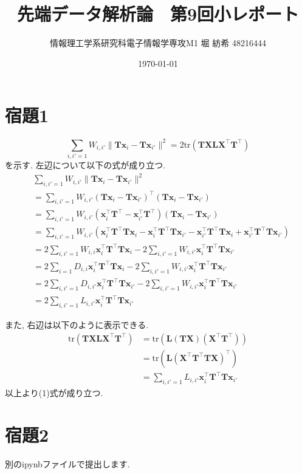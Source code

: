 \documentclass[a4paper,11pt]{jsarticle}
\begin{document}
  \title{先端データ解析論　第9回小レポート}
  \author{情報理工学系研究科電子情報学専攻M1 堀 紡希 48216444}
  \date{\today}
  \maketitle
  \section*{宿題1}
  \begin{equation}
    \sum _{i,i'=1} W_{i,i'}\|{\bm T}{\bm x}_i - {\bm T}{\bm x}_{i'}\|^2 = 2\text{tr} ({\bm T}{\bm X}{\bm L}{\bm X}^\top {\bm T}^\top)
  \end{equation}
  を示す. 左辺について以下の式が成り立つ.
  \begin{align*}
    &\sum _{i, i'=1} W_{i,i'} \|{\bm T} {\bm x}_i - {\bm T}{\bm x}_{i'}\|^2\\
    &= \sum _{i, i'=1} W_{i,i'} ({\bm T}{\bm x}_i-{\bm T}{\bm x}_{i'})^\top ({\bm T}{\bm x}_i - {\bm T}{\bm x}_{i'})\\
    &= \sum _{i, i'=1} W_{i,i'} ({\bm x}_i^\top {\bm T}^\top-{\bm x}_{i'}^\top{\bm T}^\top) ({\bm T}{\bm x}_i - {\bm T}{\bm x}_{i'})\\
    &= \sum _{i, i'=1} W_{i,i'} ({\bm x}_i^\top {\bm T}^\top{\bm T}{\bm x}_i 
    - {\bm x}_i^\top {\bm T}^\top{\bm T}{\bm x}_{i'}
    - {\bm x}_{i'}^\top {\bm T}^\top{\bm T}{\bm x}_{i}
    + {\bm x}_{i'}^\top {\bm T}^\top{\bm T}{\bm x}_{i'} 
    )\\
    &= 2\sum _{i, i'=1} W_{i, i}{\bm x}_{i}^\top {\bm T}^\top{\bm T} {\bm x}_{i} - 2\sum _{i, i'=1} W_{i, i'}{\bm x}_i^\top {\bm T}^\top{\bm T}{\bm x}_{i'}\\
    &= 2\sum _{i=1} D_{i, i}{\bm x}_i^\top {\bm T}^\top{\bm T} {\bm x}_{i} - 2\sum _{i, i'=1} W_{i, i'}{\bm x}_i^\top {\bm T}^\top{\bm T}{\bm x}_{i'}\\
    &= 2\sum _{i, i'=1} D_{i, i'}{\bm x}_i^\top {\bm T}^\top{\bm T} {\bm x}_{i'} - 2\sum _{i, i'=1} W_{i, i'}{\bm x}_i^\top {\bm T}^\top{\bm T}{\bm x}_{i'}\\
    &= 2\sum _{i, i'=1} L_{i, i'} {\bm x}_i^\top {\bm T}^\top {\bm T} {\bm x}_{i'}
  \end{align*}

  また, 右辺は以下のように表示できる.
  \begin{align*}
    \text{tr}({\bm T}{\bm X}{\bm L}{\bm X}^\top{\bm T}^\top) &= \text{tr}({\bm L}({\bm T}{\bm X})({\bm X}^\top{\bm T}^\top))\\
    &= \text{tr}({\bm L}({\bm X}^\top{\bm T}^\top{\bm T}{\bm X})^\top)\\
    &= \sum _{i, i'=1}L_{i,i'}{\bm x}_{i}^\top{\bm T}^\top {\bm T}{\bm x}_{i'}
  \end{align*}
  以上より(1)式が成り立つ.

  \section*{宿題2}
  別のipynbファイルで提出します.
\end{document}
